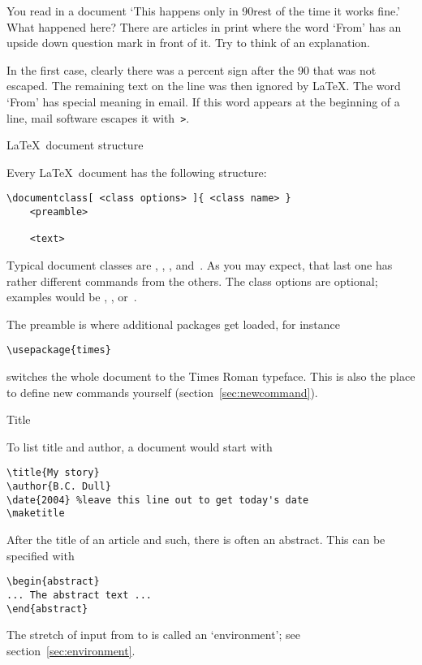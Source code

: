 \begin{594exercise}
You read in a document `This happens only in 90rest of the time
  it works fine.' What happened here? There are articles in print
  where the word `From' has an upside down question mark in front of
  it. Try to think of an explanation.
\end{594exercise}
\begin{answer}
In the first case, clearly there was a percent sign after the 90 that
was not escaped. The remaining text on the line was then ignored by
\LaTeX.
The word `From' has special meaning in email. If this word appears at
the beginning of a line, mail software escapes it with~\verb+>+.
\end{answer}

\pagebreak[2]
 {\LaTeX\ document structure}

Every \LaTeX\ document has the following structure:
\begin{verbatim}
\documentclass[ <class options> ]{ <class name> }
    <preamble>

    <text>

\end{verbatim}
Typical document classes are , , ,
and~. As you may expect, that last one has rather different
commands from the others. The class options are optional; examples
would be , , or~\n{11pt}.

The preamble is where additional packages get loaded, for instance 
\begin{verbatim}
\usepackage{times}
\end{verbatim}
switches the whole document to the Times Roman typeface. This is also
the place to define new commands yourself (section~\ref{sec:newcommand}).

 {Title} 

To list title and author, a document would start with
\begin{verbatim}
\title{My story}
\author{B.C. Dull}
\date{2004} %leave this line out to get today's date
\maketitle
\end{verbatim}
After the title of an article and such, there is often an
abstract. This can be specified with
\begin{verbatim}
\begin{abstract}
... The abstract text ...
\end{abstract}
\end{verbatim}
The stretch of input from  to  is called an
`environment'; see section~\ref{sec:environment}.

